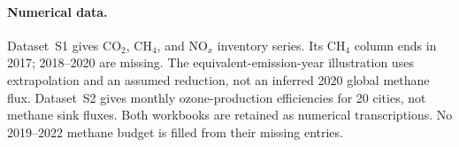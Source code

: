 \documentclass[11pt]{article}
\begin{document}
\paragraph{Numerical data.} Dataset~S1 gives CO$_2$, CH$_4$, and NO$_x$
inventory series. Its CH$_4$ column ends in 2017; 2018--2020 are missing.
The equivalent-emission-year illustration uses extrapolation and an assumed
reduction, not an inferred 2020 global methane flux. Dataset~S2 gives monthly
ozone-production efficiencies for 20 cities, not methane sink fluxes. Both
workbooks are retained as numerical transcriptions. No 2019--2022 methane
budget is filled from their missing entries.
\end{document}
